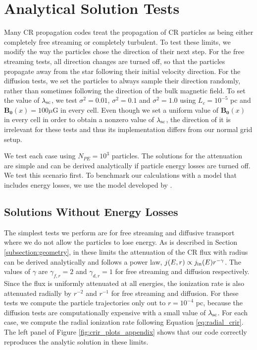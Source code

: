 \documentclass[twocolumn]{aastex63}
\begin{document}
\section{Analytical Solution Tests}
\label{appendix:tests}

Many CR propagation codes treat the propagation of CR particles as being either completely free streaming or completely turbulent. To test these limits, we modify the way the particles chose the direction of their next step. For the free streaming tests, all direction changes are turned off, so that the particles propagate away from the star following their initial velocity direction. For the diffusion tests, we set the particles to always sample their direction randomly, rather than sometimes following the direction of the bulk magnetic field. To set the value of $\lambda_{\rm sc}$, we test $\sigma^2=0.01$, $\sigma^2=0.1$ and $\sigma^2=1.0$ using $L_c=10^{-5}$ pc and $\boldsymbol{B_0}(x)=100 \mu $G in every cell. Even though we set a uniform value of $\boldsymbol{B_0}(x)$ in every cell in order to obtain a nonzero value of $\lambda_{\rm sc}$, the direction of it is irrelevant for these tests and thus its implementation differs from our normal grid setup.

We test each case using $N_{PE}=10^3$ particles. The solutions for the attenuation are simple and can be derived analytically if particle energy losses are turned off. We test this scenario first. To benchmark our calculations with a model that includes energy losses, we use the model developed by \cite{silsbee_2019_model}. 

\subsection{Solutions Without Energy Losses}
\label{appendix_subsection:tests_no_losses}

The simplest tests we perform are for free streaming and diffusive transport where we do not allow the particles to lose energy. As is described in Section \ref{subsection:geometry}, in these limits the attenuation of the CR flux with radius can be derived analytically and follows a power law, $j(E,r)\propto j_{\rm in}(E) r^{-\gamma}$. The values of $\gamma$ are $\gamma_{f,r}=2$ and $\gamma_{d,r}=1$ for free streaming and diffusion respectively. Since the flux is uniformly attenuated at all energies, the ionization rate is also attenuated radially by $r^{-2}$ and $r^{-1}$ for free streaming and diffusion. For these tests we compute the particle trajectories only out to $r=10^{-4}$ pc, because the diffusion tests are computationally expensive with a small value of $\lambda_{\rm sc}$. For each case, we compute the radial ionization rate following Equation \ref{eq:radial_crir}. The left panel of Figure \ref{fig:crir_plots_appendix} shows that our code correctly reproduces the analytic solution in these limits.
\end{document}

